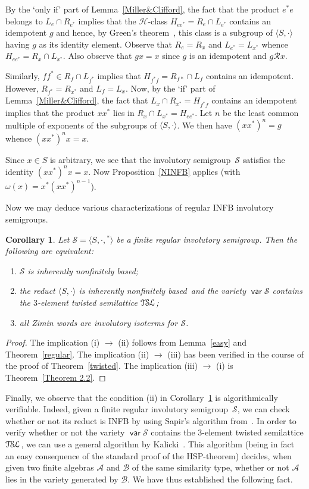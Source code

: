 \documentclass[smallextended]{svjour3}
\def\om{\omega}
\def\Rc{\mathrel{\mathscr{R}}}
\newcommand{\is}{involutory semi\-group}
\newcommand{\iss}{involutory semi\-groups}
\newcommand{\infb}{inherently non\-finitely based}
\newcommand{\TSL}{\ensuremath{\mathcal{T\kern-.5pt S\kern-.5pt L}}}
\newtheorem{Cor}[Thm]{Corollary}
\DeclareMathOperator{\var}{\mathsf{var}}
\begin{document}
By the `only if' part of Lemma~\ref{Miller&Clifford}, the fact that the product $e^*e$ belongs to $L_e\cap R_{e^*}$ implies that the
$\mathscr{H}$-class $H_{ee^*}=R_e\cap L_{e^*}$ contains an idempotent $g$ and hence, by Green's theorem~\cite[Theorem~2.2.5]{how}, this
class is a subgroup of $\langle S,\cdot\rangle$ having $g$ as its identity element. Observe that $R_e=R_x$ and $L_{e^*}=L_{x^*}$ whence
$H_{ee^*}=R_x\cap L_{x^*}$. Also observe that $gx=x$ since $g$ is an idempotent and $g\Rc x$.

Similarly, $ff^*\in R_f\cap L_{f^*}$ implies that $H_{f^*f}=R_{f*}\cap L_f$ contains an idempotent. However, $R_{f^*}=R_{x^*}$ and
$L_f=L_x$. Now, by the `if' part of Lemma~\ref{Miller&Clifford}, the fact that $L_x\cap R_{x^*}=H_{f^*f}$ contains an idempotent implies
that the product $xx^*$ lies in $R_x\cap L_{x^*}=H_{ee^*}$. Let $n$ be the least common multiple of exponents of the subgroups of $\langle
S,\cdot\rangle$. We then have $(xx^*)^n=g$ whence $(xx^*)^nx=x$.

Since $x\in S$ is arbitrary, we see that the \is\ $\mathcal{S}$ satisfies the identity $(xx^*)^nx=x$. Now Proposition~\ref{NINFB} applies
(with $\om(x)=x^*(xx^*)^{n-1}$).

Now we may deduce various characterizations of regular INFB \iss.
\renewcommand{\labelenumi}{\emph{(\roman{enumi})}}
\begin{Cor}
\label{characterization} Let $\mathcal{S}=\langle S,\cdot,{}^*\rangle$ be a finite regular \is. Then the following are equivalent:
\begin{enumerate}
\item $\mathcal{S}$ is \infb;
\item the reduct $\langle S,\cdot\rangle$ is \infb\ and the variety $\var\mathcal{S}$ contains the $3$-element twisted
semilattice $\TSL$;
\item all Zimin words are involutory isoterms for $\mathcal{S}$.
\end{enumerate}
\end{Cor}

\begin{proof}
The implication (i) $\to$ (ii) follows from Lemma~\ref{easy} and Theorem~\ref{regular}. The implication (ii) $\to$ (iii) has been verified
in the course of the proof of Theorem~\ref{twisted}. The implication (iii) $\to$ (i) is Theorem~\ref{Theorem 2.2}.
\end{proof}

Finally, we observe that the condition (ii) in Corollary~\ref{characterization} is algorithmically verifiable. Indeed, given a finite
regular \is\ $\mathcal{S}$, we can check whether or not its reduct is INFB by using Sapir's algorithm from~\cite{Sapir:1987}. In order to
verify whether or not the variety $\var\mathcal{S}$ contains the $3$-element twisted semilattice $\TSL$, we can use a general algorithm by
Kalicki~\cite{Kalicki:1952}. This algorithm (being in fact an easy consequence of the standard proof of the HSP-theorem) decides, when
given two finite algebras $\mathcal{A}$ and $\mathcal{B}$ of the same similarity type, whether or not $\mathcal{A}$ lies in the variety
generated by $\mathcal{B}$. We have thus established the following fact.
\end{document}
